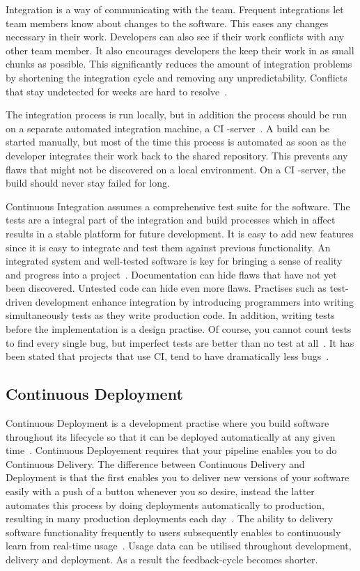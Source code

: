 \documentclass[english]{tktltiki2}
\begin{document}
Integration is a way of communicating with the team. Frequent integrations let team members know about changes to the software. This eases any changes necessary in their work. Developers can also see if their work conflicts with any other team member. It also encourages developers the keep their work in as small chunks as possible. This significantly reduces the amount of integration problems by shortening the integration cycle and removing any unpredictability. Conflicts that stay undetected for weeks are hard to resolve~\cite{Fow06}.

The integration process is run locally, but in addition the process should be run on a separate automated integration machine, a CI -server~\cite{Fow06}. A build can be started manually, but most of the time this process is automated as soon as the developer integrates their work back to the shared repository. This prevents any flaws that might not be discovered on a local environment. On a CI -server, the build should never stay failed for long.

Continuous Integration assumes a comprehensive test suite for the software. The tests are a integral part of the integration and build processes which in affect results in a stable platform for future development. It is easy to add new features since it is easy to integrate and test them against previous functionality. An integrated system and well-tested software is key for bringing a sense of reality and progress into a project~\cite{Fow05}. Documentation can hide flaws that have not yet been discovered. Untested code can hide even more flaws. Practises such as test-driven development enhance integration by introducing programmers into writing simultaneously tests as they write production code. In addition, writing tests before the implementation is a design practise. Of course, you cannot count tests to find every single bug, but imperfect tests are better than no test at all~\cite{Fow06}. It has been stated that projects that use CI, tend to have dramatically less bugs~\cite{Fow06}.

\subsection{Continuous Deployment}

Continuous Deployment is a development practise where you build software throughout its lifecycle so that it can be deployed automatically at any given time~\cite{Fow13a}. Continuous Deployement requires that your pipeline enables you to do Continuous Delivery. The difference between Continuous Delivery and Deployment is that the first enables you to deliver new versions of your software easily with a push of a button whenever you so desire, instead the latter automates this process by doing deployments automatically to production, resulting in many production deployments each day~\cite{OR11, Sny13, Rub14}. The ability to delivery software functionality frequently to users subsequently enables to continuously learn from real-time usage~\cite{HAB12}. Usage data can be utilised throughout development, delivery and deployment. As a result the feedback-cycle becomes shorter.
\end{document}
